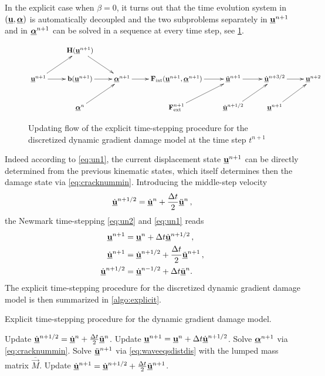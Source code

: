 In the explicit case when $\beta=0$, it turns out that the time evolution system in $(\uvec,\dvec)$ is automatically decoupled and the two subproblems separately in $\uvec^{n+1}$ and in $\dvec^{n+1}$ can be solved in a sequence at every time step, see \cref{fig:updatestate}.
\begin{figure}[htbp]
\normalsize
\centering
\[
\xymatrix{ & \vec{H}(\uvec^{n+1}) \ar[dr] & & & & & \\
\uvec^{n+1} \ar[ur] \ar[r] & \vec{b}(\uvec^{n+1}) \ar[r] & \dvec^{n+1} \ar[r] & \vec{F}_\mathrm{int}(\uvec^{n+1},\dvec^{n+1}) \ar[r] & \ddot{\uvec}^{n+1} \ar[r] & \dot{\uvec}^{n+3/2} \ar[r] & \uvec^{n+2} \\
& \dvec^n \ar[ur] & & \vec{F}_\mathrm{ext}^{n+1} \ar[ur] & \dot{\uvec}^{n+1/2} \ar[ur] & \uvec^{n+1} \ar[ur] &}
\]
\caption{Updating flow of the explicit time-stepping procedure for the discretized dynamic gradient damage model at the time step $t^{n+1}$}
\label{fig:updatestate}
\end{figure}
Indeed according to \eqref{eq:un1}, the current displacement state $\uvec^{n+1}$ can be directly determined from the previous kinematic states, which itself determines then the damage state via \eqref{eq:cracknummin}. Introducing the middle-step velocity
\[
\dot{\uvec}^{n+1/2}=\dot{\uvec}^n+\frac{\Delta t}{2}\ddot{\uvec}^n\,,
\]
the Newmark time-stepping \eqref{eq:un2} and \eqref{eq:un1} reads
\begin{align*}
\uvec^{n+1} &= \uvec^n+\Delta t\dot{\uvec}^{n+1/2}\,, \\
\dot{\uvec}^{n+1} &= \dot{\uvec}^{n+1/2}+\frac{\Delta t}{2}\ddot{\uvec}^{n+1}\,, \\
\dot{\uvec}^{n+1/2} &= \dot{\uvec}^{n-1/2}+\Delta t\ddot{\uvec}^{n}.
\end{align*}
The explicit time-stepping procedure for the discretized dynamic gradient damage model is then summarized in \cref{algo:explicit}.
\begin{algorithm}[htbp]
\caption{Explicit time-stepping procedure for the dynamic gradient damage model.} \label{algo:explicit}
\begin{algorithmic}[1]\linespread{1.2}\selectfont\normalsize
{}
  \State Update $\dot{\uvec}^{n+1/2}=\dot{\uvec}^{n}+\frac{\Delta t}{2}\ddot{\uvec}^n$.
  \State Update $\uvec^{n+1}=\uvec^n+\Delta t\dot{\uvec}^{n+1/2}$.
  \State Solve $\dvec^{n+1}$ via \eqref{eq:cracknummin}.
  \State Solve $\ddot{\uvec}^{n+1}$ via \eqref{eq:waveeqsdistdis} with the lumped mass matrix $\overline{\vec{M}}$.
  \State Update $\dot{\uvec}^{n+1}=\dot{\uvec}^{n+1/2}+\frac{\Delta t}{2}\ddot{\uvec}^{n+1}$.
\EndFor
\end{algorithmic}
\end{algorithm}

